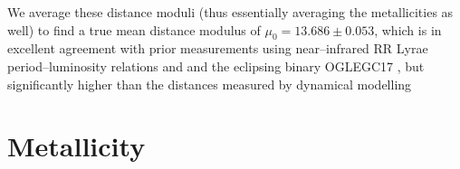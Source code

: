 \documentclass[a4paper,fleqn,usenatbib]{mnras}
\begin{document}
We average these distance moduli (thus essentially averaging the metallicities as well) to find a true mean distance modulus of $\mu_0 = 13.686 \pm 0.053$, which is in excellent agreement with prior measurements using near--infrared RR Lyrae period--luminosity relations \citep{2006ApJ...652..362D} and and the eclipsing binary OGLEGC17 \citep{2001AJ....121.3089T}, but significantly higher than the distances measured by dynamical modelling \citep{2006A&A...445..513V,
2013MNRAS.436.2598W}

\section{Metallicity}
\label{sec:metallicity}



\end{document}
